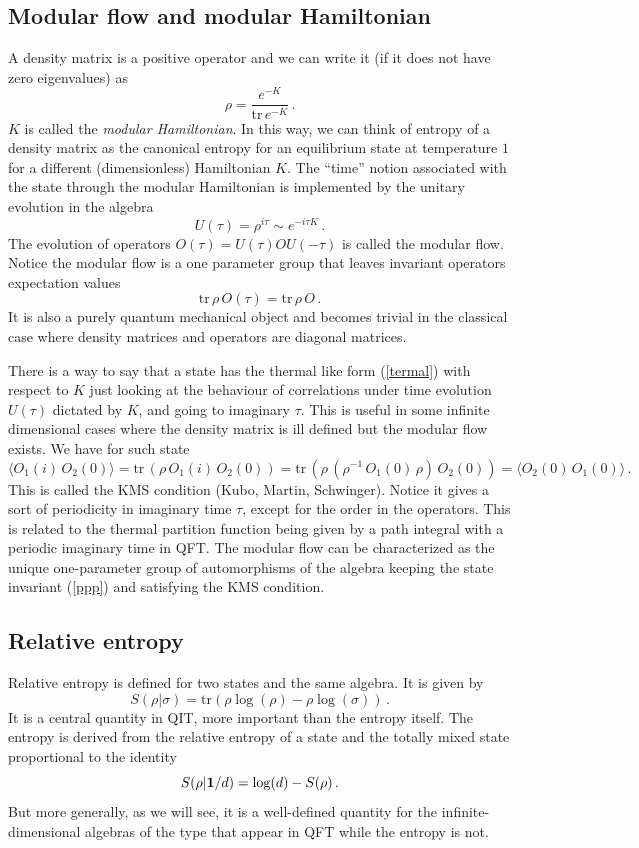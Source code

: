 \documentclass[12pt]{article}
\numberwithin{equation}{section}
\newcommand{\be}{\begin{equation}}
\newcommand{\ee}{\end{equation}}
\begin{document}
\subsection{Modular flow and modular Hamiltonian}

A density matrix is a positive operator and we can write it (if it does not have zero eigenvalues) as
\be
\rho= \frac{e^{-K}}{\textrm{tr}\,e^{-K}}\,. \label{termal}
\ee
$K$ is called the {\sl modular Hamiltonian}. In this way, we can think of entropy of a density matrix as the canonical entropy for an equilibrium state at temperature $1$ for a different (dimensionless) Hamiltonian $K$. The ``time'' notion associated with the state through the modular Hamiltonian is implemented by the unitary evolution in the algebra
\be
U(\tau)=\rho^{i \tau}\sim e^{-i \tau K}\,. \label{modflow}
\ee      
The evolution of operators $O(\tau)= U(\tau) O U(-\tau)$ is called the modular flow. Notice the modular flow is a one parameter group that leaves invariant operators expectation values
\be
\textrm{tr}\,\rho \, O(\tau)=\textrm{tr}\,\rho \, O\,.\label{ppp}
\ee
It is also a purely quantum mechanical object and becomes trivial in the classical case where density matrices and operators are diagonal matrices. 

There is a way to say that a state has the thermal like form (\ref{termal}) with respect to $K$ just looking at the behaviour of correlations under time evolution $U(\tau)$ dictated by $K$, and going to imaginary $\tau$. This is useful in some infinite dimensional cases where the density matrix is ill defined but the modular flow exists. We have for such state 
\be
\langle O_1(i)\,O_2(0)\rangle= \textrm{tr}\,(\rho\, O_1(i)\,O_2(0)) =\textrm{tr}\,(\rho\, (\rho^{-1}\,O_1(0)\,\rho)\,O_2(0)) =\langle O_2(0)\,O_1(0)\rangle\,. \label{kms}
\ee
This is called the KMS condition (Kubo, Martin, Schwinger). Notice it gives a sort of periodicity in imaginary time $\tau$, except for the order in the operators. 
 This is related to the thermal partition function being given by a path integral with a periodic imaginary time in QFT. The modular flow can be characterized as the unique one-parameter group of automorphisms of the algebra keeping the state invariant (\ref{ppp}) and satisfying the KMS condition.  

\subsection{Relative entropy}
Relative entropy is defined for two states and the same algebra. It is given by
\begin{equation}
S(\rho|\sigma) = \textrm{tr}( \rho \log (\rho)-\rho \log(\sigma))\,.
\end{equation}
It is a central quantity in QIT, more important than the entropy itself. The entropy is derived from the relative entropy of a state and the totally mixed state proportional to the identity
\be
S(\rho|{\bf 1}/d)=\log(d)-S(\rho)\,. 
\ee
But more generally, as we will see, it is a well-defined quantity for the infinite-dimensional algebras of the type that appear in QFT while the entropy is not.  
\end{document}
